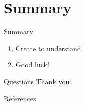 \documentclass[slidecentered,compress,dvipsnames,table,xcdraw,aspectratio=169]{beamer}
\newcommand{\colorshow}[1]{
	\begin{tikzpicture}
		\node[fill=#1,
		circle,
		minimum size=2ex,
		label={\tiny \StrSubstitute{#1}{_}{\ }},
		] at (0,0){};
	\end{tikzpicture}
	}
\begin{document}
\section{Summary}
\label{sec:summary}

\begin{frame}{Summary}
	\begin{enumerate}
		\item [\faIcon{magic}] Create to understand
		\item [\faIcon{rocket}] Good luck!

	\end{enumerate}
\end{frame}



\begin{frame}{Questions}
	\centering
	Thank you
\end{frame}

\begin{frame}[allowframebreaks]{References}
	\printbibliography
\end{frame}
\end{document}
